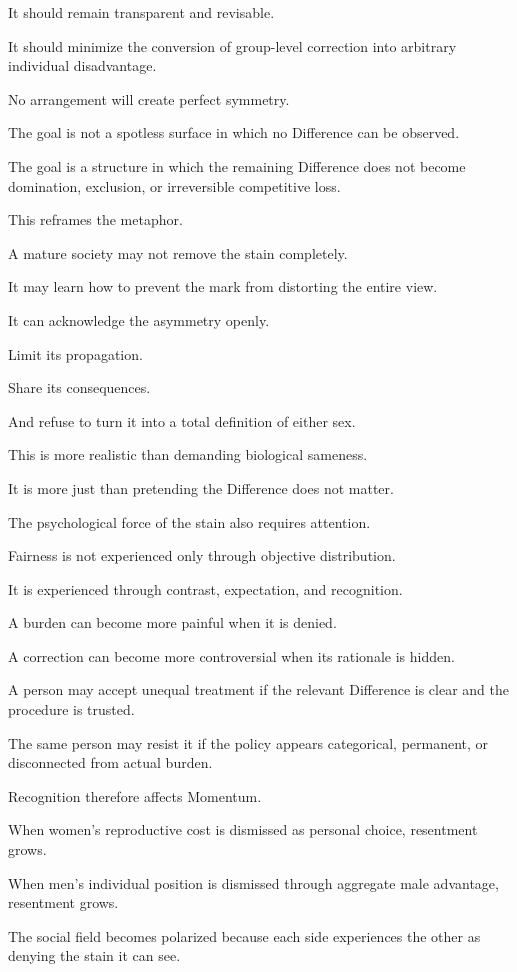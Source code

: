 It should remain transparent and revisable.

It should minimize the conversion of group-level correction into arbitrary individual disadvantage.

No arrangement will create perfect symmetry.

The goal is not a spotless surface in which no Difference can be observed.

The goal is a structure in which the remaining Difference does not become domination, exclusion, or irreversible competitive loss.

This reframes the metaphor.

A mature society may not remove the stain completely.

It may learn how to prevent the mark from distorting the entire view.

It can acknowledge the asymmetry openly.

Limit its propagation.

Share its consequences.

And refuse to turn it into a total definition of either sex.

This is more realistic than demanding biological sameness.

It is more just than pretending the Difference does not matter.

The psychological force of the stain also requires attention.

Fairness is not experienced only through objective distribution.

It is experienced through contrast, expectation, and recognition.

A burden can become more painful when it is denied.

A correction can become more controversial when its rationale is hidden.

A person may accept unequal treatment if the relevant Difference is clear and the procedure is trusted.

The same person may resist it if the policy appears categorical, permanent, or disconnected from actual burden.

Recognition therefore affects Momentum.

When women’s reproductive cost is dismissed as personal choice, resentment grows.

When men’s individual position is dismissed through aggregate male advantage, resentment grows.

The social field becomes polarized because each side experiences the other as denying the stain it can see.

